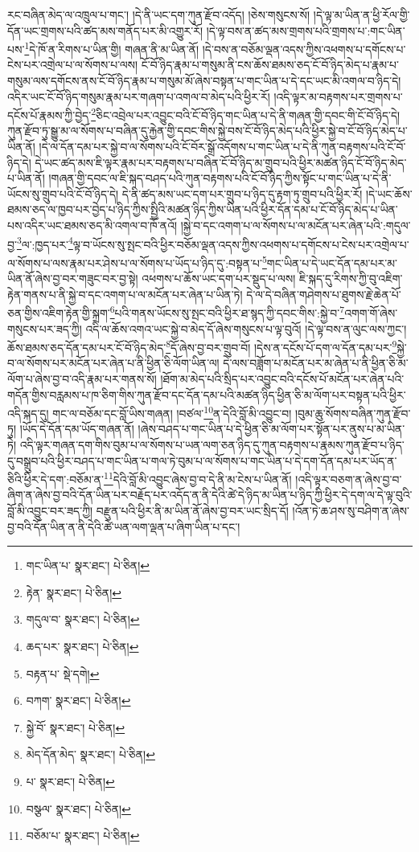 རང་བཞིན་མེད་ལ་འཁྲུལ་པ་གང་། །དེ་ནི་ཡང་དག་ཀུན་རྫོབ་འདོད། །ཅེས་གསུངས་སོ། །དེ་ལྟ་མ་ཡིན་ན་ཕྱི་རོལ་གྱི་དོན་ཡང་གྲགས་པའི་ཚད་མས་གནོད་པར་མི་འགྱུར་རོ། །དེ་ལྟ་བས་ན་ཚད་མས་གྲགས་པའི་གྲགས་པ་:གང་ཡིན་པས་\footnote{གང་ཡིན་པ་  སྣར་ཐང་།  པེ་ཅིན། }དེ་ཁོ་ན་རིགས་པ་ཡིན་གྱི། གཞན་ནི་མ་ཡིན་ནོ། །དེ་བས་ན་བཅོམ་ལྡན་འདས་ཀྱིས་འཕགས་པ་དགོངས་པ་ངེས་པར་འགྲེལ་པ་ལ་སོགས་པ་ལས། ངོ་བོ་ཉིད་རྣམ་པ་གསུམ་ནི་ངས་ཆོས་ཐམས་ཅད་ངོ་བོ་ཉིད་མེད་པ་རྣམ་པ་གསུམ་ལས་དགོངས་ནས་ངོ་བོ་ཉིད་རྣམ་པ་གསུམ་མོ་ཞེས་བསྟན་པ་གང་ཡིན་པ་དེ་དང་ཡང་མི་འགལ་བ་ཉིད་དེ། འདིར་ཡང་ངོ་བོ་ཉིད་གསུམ་རྣམ་པར་གཞག་པ་འགལ་བ་མེད་པའི་ཕྱིར་རོ། །འདི་ལྟར་མ་བརྟགས་པར་གྲགས་པ་དངོས་པོ་རྣམས་ཀྱི་བྱེད་\footnote{རྟེན་  སྣར་ཐང་།  པེ་ཅིན། }ཅིང་འབྲེལ་པར་འབྱུང་བའི་ངོ་བོ་ཉིད་གང་ཡིན་པ་དེ་ནི་གཞན་གྱི་དབང་གི་ངོ་བོ་ཉིད་དེ། ཀུན་རྫོབ་ཏུ་སྒྱུ་མ་ལ་སོགས་པ་བཞིན་དུ་རྐྱེན་གྱི་དབང་གིས་སྐྱེ་བས་ངོ་བོ་ཉིད་མེད་པའི་ཕྱིར་སྐྱེ་བ་ངོ་བོ་ཉིད་མེད་པ་ཡིན་ནོ། །དེ་ལ་དོན་དམ་པར་སྐྱེ་བ་ལ་སོགས་པའི་ངོ་བོར་སྒྲོ་འདོགས་པ་གང་ཡིན་པ་དེ་ནི་ཀུན་བརྟགས་པའི་ངོ་བོ་ཉིད་དེ། དེ་ཡང་ཚད་མས་ཇི་ལྟར་རྣམ་པར་བརྟགས་པ་བཞིན་ངོ་བོ་ཉིད་མ་གྲུབ་པའི་ཕྱིར་མཚན་ཉིད་ངོ་བོ་ཉིད་མེད་པ་ཡིན་ནོ། །གཞན་གྱི་དབང་ལ་ཇི་སྐད་བཤད་པའི་ཀུན་བརྟགས་པའི་ངོ་བོ་ཉིད་ཀྱིས་སྟོང་པ་གང་ཡིན་པ་དེ་ནི་ཡོངས་སུ་གྲུབ་པའི་ངོ་བོ་ཉིད་དེ། དེ་ནི་ཚད་མས་ཡང་དག་པར་གྲུབ་པ་ཉིད་དུ་རྟག་ཏུ་གྲུབ་པའི་ཕྱིར་རོ། །དེ་ཡང་ཆོས་ཐམས་ཅད་ལ་ཁྱབ་པར་བྱེད་པ་ཉིད་ཀྱིས་སྤྱིའི་མཚན་ཉིད་ཀྱིས་ཡིན་པའི་ཕྱིར་དོན་དམ་པ་ངོ་བོ་ཉིད་མེད་པ་ཡིན་པས་འདིར་ཡང་ཐམས་ཅད་མི་འགལ་བ་ཁོ་ནའོ། །སྐྱེ་བ་དང་འགག་པ་ལ་སོགས་པ་ལ་མངོན་པར་ཞེན་པའི་:གདུལ་བྱ་\footnote{གདུལ་བ་  སྣར་ཐང་།  པེ་ཅིན། }ལ་:ཁྱད་པར་\footnote{ཆད་པར་  སྣར་ཐང་།  པེ་ཅིན། }ལྟ་བ་ཡོངས་སུ་སྤང་བའི་ཕྱིར་བཅོམ་ལྡན་འདས་ཀྱིས་འཕགས་པ་དགོངས་པ་ངེས་པར་འགྲེལ་པ་ལ་སོགས་པ་ལས་རྣམ་པར་ཤེས་པ་ལ་སོགས་པ་ཡོད་པ་ཉིད་དུ་:བསྟན་པ་\footnote{བརྟན་པ་  སྡེ་དགེ། }གང་ཡིན་པ་དེ་ཡང་དོན་དམ་པར་མ་ཡིན་ནོ་ཞེས་བྱ་བར་གཟུང་བར་བྱ་སྟེ། འཕགས་པ་ཆོས་ཡང་དག་པར་སྡུད་པ་ལས། ཇི་སྐད་དུ་རིགས་ཀྱི་བུ་འཇིག་རྟེན་གནས་པ་ནི་སྐྱེ་བ་དང་འགག་པ་ལ་མངོན་པར་ཞེན་པ་ཡིན་ཏེ། དེ་ལ་དེ་བཞིན་གཤེགས་པ་ཐུགས་རྗེ་ཆེན་པོ་ཅན་གྱིས་འཇིག་རྟེན་གྱི་སྐྲག་\footnote{བཀག་  སྣར་ཐང་།  པེ་ཅིན། }པའི་གནས་ཡོངས་སུ་སྤང་བའི་ཕྱིར་ཐ་སྙད་ཀྱི་དབང་གིས་:སྐྱེ་བ་\footnote{སྐྱེ་བོ་  སྣར་ཐང་།  པེ་ཅིན། }འགག་གོ་ཞེས་གསུངས་པར་ཟད་ཀྱི། འདི་ལ་ཆོས་འགའ་ཡང་སྐྱེ་བ་མེད་དོ་ཞེས་གསུངས་པ་ལྟ་བུའོ། །དེ་ལྟ་བས་ན་ལུང་ལས་ཀྱང་། ཆོས་ཐམས་ཅད་དོན་དམ་པར་ངོ་བོ་ཉིད་མེད་\footnote{མེད་དོན་མེད་  སྣར་ཐང་།  པེ་ཅིན། }དོ་ཞེས་བྱ་བར་གྲུབ་བོ། །དེས་ན་དངོས་པོ་དག་ལ་དོན་དམ་པར་\footnote{པ་  སྣར་ཐང་།  པེ་ཅིན། }སྐྱེ་བ་ལ་སོགས་པར་མངོན་པར་ཞེན་པ་ནི་ཕྱིན་ཅི་ལོག་ཡིན་ལ། དེ་ལས་བཟློག་པ་མངོན་པར་མ་ཞེན་པ་ནི་ཕྱིན་ཅི་མ་ལོག་པ་ཞེས་བྱ་བ་འདི་རྣམ་པར་གནས་སོ། །ཐོག་མ་མེད་པའི་སྲིད་པར་འབྱུང་བའི་དངོས་པོ་མངོན་པར་ཞེན་པའི་གདོན་གྱིས་བརླམས་པ་ཁ་ཅིག་གིས་ཀུན་རྫོབ་དང་དོན་དམ་པའི་མཚན་ཉིད་ཕྱིན་ཅི་མ་ལོག་པར་བསྟན་པའི་ཕྱིར་འདི་སྐད་དུ། གང་ལ་བཅོམ་དང་བློ་ཡིས་གཞན། །བཙལ་\footnote{བསྩལ་  སྣར་ཐང་།  པེ་ཅིན། }ན་དེའི་བློ་མི་འབྱུང་བ། །བུམ་ཆུ་སོགས་བཞིན་ཀུན་རྫོབ་ཏུ། །ཡོད་དེ་དོན་དམ་ཡོད་གཞན་ནོ། །ཞེས་བཤད་པ་གང་ཡིན་པ་དེ་ཕྱིན་ཅི་མ་ལོག་པར་སྟོན་པར་ནུས་པ་མ་ཡིན་ཏེ། འདི་ལྟར་གཞན་དག་གིས་བུམ་པ་ལ་སོགས་པ་ཡན་ལག་ཅན་ཉིད་དུ་ཀུན་བརྟགས་པ་རྣམས་ཀུན་རྫོབ་པ་ཉིད་དུ་བསྒྲུབ་པའི་ཕྱིར་བཤད་པ་གང་ཡིན་པ་གལ་ཏེ་བུམ་པ་ལ་སོགས་པ་གང་ཡིན་པ་དེ་དག་དོན་དམ་པར་ཡོད་ན་ཅིའི་ཕྱིར་དེ་དག་:བཅོམ་ན་\footnote{བཅོམ་པ་  སྣར་ཐང་།  པེ་ཅིན། }དེའི་བློ་མི་འབྱུང་ཞེས་བྱ་བ་དེ་ནི་མ་ངེས་པ་ཡིན་ནོ། །འདི་ལྟར་བཅག་ན་ཞེས་བྱ་བ་ཞིག་ན་ཞེས་བྱ་བའི་དོན་ཡིན་པར་བརྗོད་པར་འདོད་ན་ནི་དེའི་ཚེ་དེ་ཉིད་མ་ཡིན་པ་ཉིད་ཀྱི་ཕྱིར་དེ་དག་ལ་དེ་ལྟ་བུའི་བློ་མི་འབྱུང་བར་ཟད་ཀྱི། བརྫུན་པའི་ཕྱིར་ནི་མ་ཡིན་ནོ་ཞེས་བྱ་བར་ཡང་སྲིད་དོ། །འོན་ཏེ་ཆ་ཤས་སུ་བཤིག་ན་ཞེས་བྱ་བའི་དོན་ཡིན་ན་ནི་དེའི་ཚེ་ཡན་ལག་ལྡན་པ་ཞིག་ཡིན་པ་དང་། 